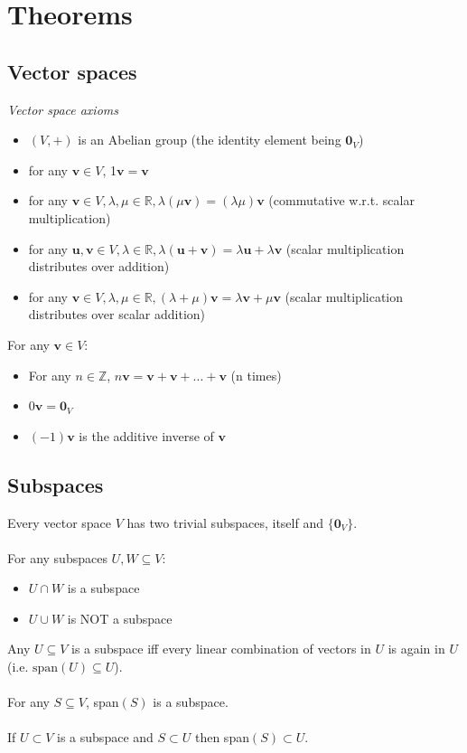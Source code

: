 \documentclass{scrartcl}
\newcommand{\R}{\mathbb{R}}
\newcommand{\Z}{\mathbb{Z}}
\renewcommand{\vec}[1]{\mathbf{#1}}
\begin{document}
\section{Theorems}

\subsection{Vector spaces}
\textit{Vector space axioms}
\begin{itemize}
\item $ (V, +) $ is an Abelian group (the identity element being $ \vec{0}_{V} $)
\item for any $ \vec{v} \in V $, 1$ \vec{v} = \vec{v} $
\item for any $ \vec{v} \in V, \lambda, \mu \in \R, \lambda (\mu \vec{v}) = (\lambda \mu) \vec{v} $ (commutative w.r.t. scalar multiplication)
\item for any $ \vec{u}, \vec{v} \in V, \lambda \in \R, \lambda (\vec{u}  + \vec{v}) = \lambda \vec{u}  + \lambda \vec{v} $ (scalar multiplication distributes over addition)
\item for any $ \vec{v} \in V, \lambda, \mu \in \R, (\lambda + \mu) \vec{v} = \lambda \vec{v}  + \mu \vec{v} $ (scalar multiplication distributes over scalar addition)
\end{itemize}
For any $ \vec{v} \in V $:
\begin{itemize}
\item For any $ n \in \Z $, $ n\vec{v} = \vec{v} + \vec{v} + ... + \vec{v} $ (n times)
\item $ 0 \vec{v} = \vec{0}_{V} $
\item $ (-1) \vec{v} $ is the additive inverse of $ \vec{v} $
\end{itemize}

\subsection{Subspaces}
Every vector space $ V $ has two trivial subspaces, itself and $ \{ \vec{0}_{V} \} $.
\\\\
For any subspaces $ U, W \subseteq V $:
\begin{itemize}
\item $ U \cap W $ is a subspace
\item $ U \cup W $ is NOT a subspace
\end{itemize}
Any $ U \subseteq V $ is a subspace iff every linear combination of vectors in $ U $ is again in $ U $ (i.e. $ \textrm{span}(U) \subseteq U $).
\\\\
For any $ S \subseteq V $, span$ (S) $ is a subspace.
\\\\
If $ U  \subset V $ is a subspace and $ S \subset U $ then span$ (S) \subset U $.
\end{document}

